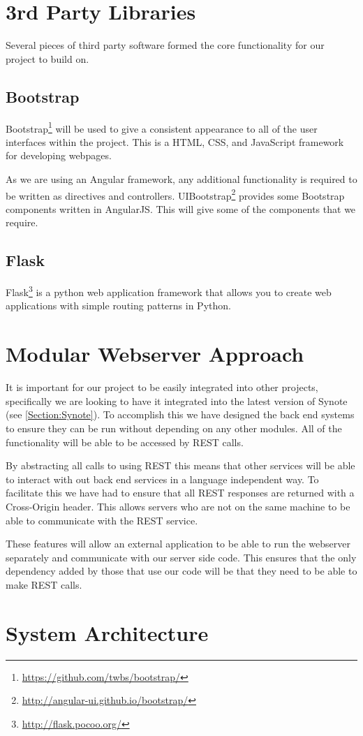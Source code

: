 \section{3rd Party Libraries}
Several pieces of third party software formed the core functionality for our project to build on. 

\subsection{Bootstrap}
\label{Section:Bootstrap}
Bootstrap\footnote{\url{https://github.com/twbs/bootstrap/}} will be used to give a consistent appearance to all of the user interfaces within the project. This is a HTML, \gls{CSS}, and JavaScript framework for developing webpages.

As we are using an Angular framework, any additional functionality is required to be written as directives and controllers. UIBootstrap\footnote{\url{http://angular-ui.github.io/bootstrap/}} provides some Bootstrap components written in \gls{AngularJS}. This will give some of the components that we require.

\subsection{Flask}
\label{Section:Flask}
Flask\footnote{\url{http://flask.pocoo.org/}} is a python web application framework that allows you to create web applications with simple routing patterns in Python.

\section{Modular Webserver Approach}
\label{Section:Modular Approach}
It is important for our project to be easily integrated into other projects, specifically we are looking to have it integrated into the latest version of Synote (see \autoref{Section:Synote}). To accomplish this we have designed the back end systems to ensure they can be run without depending on any other modules. All of the functionality will be able to be accessed by \gls{REST} calls.

By abstracting all calls to using \gls{REST} this means that other services will be able to interact with out back end services in a language independent way. To facilitate this we have had to ensure that all \gls{REST} responses are returned with a Cross-Origin header. This allows servers who are not on the same machine to be able to communicate with the \gls{REST} service.

These features will allow an external application to be able to run the webserver separately and communicate with our server side code. This ensures that the only dependency added by those that use our code will be that they need to be able to make \gls{REST} calls.

\section{System Architecture}



